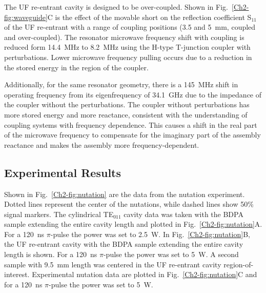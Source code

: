 The UF re-entrant \cylTE{} cavity is designed to be over-coupled. Shown in Fig.~\ref{Ch2-fig:waveguide}C is the effect of the movable short on the reflection coefficient S$_{\text{11}}$ of the UF re-entrant \cylTE{} with a range of coupling positions (3.5 and 5~mm, coupled and over-coupled). The resonator microwave frequency shift with coupling is reduced form 14.4~MHz to 8.2~MHz using the H-type T-junction coupler with perturbations. Lower microwave frequency pulling occurs due to a reduction in the stored energy in the region of the coupler. 

Additionally, for the same resonator geometry, there is a 145~MHz shift in operating frequency from its eigenfrequency of 34.1~GHz due to the impedance of the coupler without the perturbations. The coupler without perturbations has more stored energy and more reactance, consistent with the understanding of coupling systems with frequency dependence. \cite{Mett2009} This causes a shift in the real part of the microwave frequency to compensate for the imaginary part of the assembly reactance and makes the assembly more frequency-dependent. 

\subsection{Experimental Results}
Shown in Fig.~\ref{Ch2-fig:nutation} are the data from the nutation experiment. Dotted lines represent the center of the nutations, while dashed lines show 50\% signal markers. The cylindrical TE$_{011}$ cavity data was taken with the BDPA sample extending the entire cavity length and plotted in Fig.~\ref{Ch2-fig:nutation}A. For a 120~ns $\pi$-pulse the power was set to 2.5~W. In Fig.~\ref{Ch2-fig:nutation}B, the UF re-entrant \cylTE{} cavity with the BDPA sample extending the entire cavity length is shown. For a 120~ns $\pi$-pulse the power was set to 5~W. A second sample with 9.5~mm length was centered in the UF re-entrant \cylTE{} cavity region-of-interest. Experimental nutation data are plotted in Fig.~\ref{Ch2-fig:nutation}C and for a 120~ns $\pi$-pulse the power was set to 5~W.


